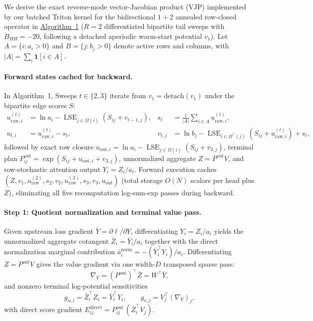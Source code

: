 \documentclass[11pt]{article}
\begin{document}
We derive the exact reverse-mode vector-Jacobian product (VJP) implemented by our batched Triton kernel for the bidirectional $1+2$ annealed row-closed operator in \hyperlink{alg:thot}{Algorithm~1} ($R = 2$ differentiated bipartite tail sweeps with $B_{HH} = -20$, following a detached aperiodic warm-start potential $v_1$). Let $A = \{i : a_i > 0\}$ and $B = \{j : b_j > 0\}$ denote active rows and columns, with $|A| = \sum_{i} \mathbf{1}[i \in A]$.

\paragraph{Forward states cached for backward.}
In Algorithm~1, Sweeps $t \in \{2, 3\}$ iterate from $v_1 = \mathrm{detach}(v_1)$ under the bipartite edge scores $S$:
\begin{align}
  u^{(t)}_{\text{raw},i} &= \ln a_i - \operatorname{LSE}_{j \in \Omega(i)}(S_{ij} + v_{t-1,j}), &
  s_t &= \frac{1}{|A|} \sum_{i \in A} u^{(t)}_{\text{raw},i}, \nonumber\\
  u_{t,i} &= u^{(t)}_{\text{raw},i} - s_t, &
  v_{t,j} &= \ln b_j - \operatorname{LSE}_{i \in \Omega^\top(j)}(S_{ij} + u^{(t)}_{\text{raw},i}) + s_t,
  \label{eq:app-forward-sweep}
\end{align}
followed by exact row closure $u_{\text{out},i} = \ln a_i - \operatorname{LSE}_{j \in \Omega(i)}(S_{ij} + v_{3,j})$, terminal plan $P^{\text{out}}_{ij} = \exp(S_{ij} + u_{\text{out},i} + v_{3,j})$, unnormalized aggregate $Z = P^{\text{out}} V$, and row-stochastic attention output $Y_i = Z_i / a_i$. Forward execution caches $(Z, v_1, u^{(2)}_{\text{raw}}, s_2, v_2, u^{(3)}_{\text{raw}}, s_3, v_3, u_{\text{out}})$ (total storage $O(N)$ scalars per head plus $Z$), eliminating all five recomputation log-sum-exp passes during backward.

\paragraph{Step 1: Quotient normalization and terminal value pass.}
Given upstream loss gradient $\bar{Y} = \partial \ell / \partial Y$, differentiating $Y_i = Z_i / a_i$ yields the unnormalized aggregate cotangent $\bar{Z}_i = \bar{Y}_i / a_i$ together with the direct normalization marginal contribution $\bar{a}^{\text{norm}}_i = -(\bar{Y}_i^\top Y_i) / a_i$. Differentiating $Z = P^{\text{out}} V$ gives the value gradient via one width-$D$ transposed sparse pass:
\begin{equation}
  \nabla_V = (P^{\text{out}})^\top \bar{Z} = W^\top \bar{Y},
\end{equation}
and nonzero terminal log-potential sensitivities
\begin{equation}
  g_{u,i} = \bar{Z}_i^\top Z_i = \bar{Y}_i^\top Y_i, \qquad
  g_{v,j} = V_j^\top (\nabla_V)_j,
  \label{eq:app-terminal-gu-gv}
\end{equation}
with direct score gradient $E^{\text{direct}}_{ij} = P^{\text{out}}_{ij}\, (\bar{Z}_i^\top V_j)$.
\end{document}
